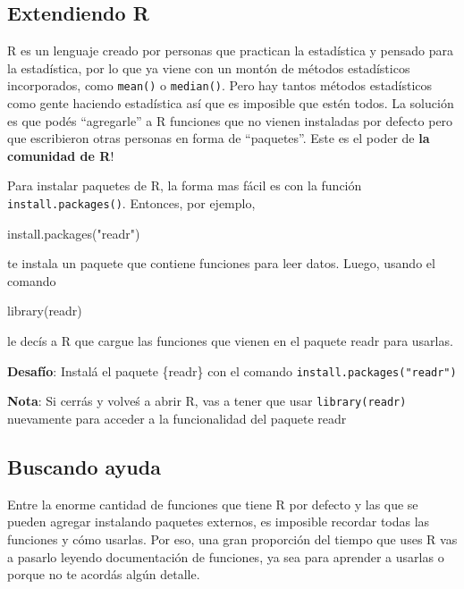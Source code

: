 \documentclass[
  openany]{book}
\newenvironment{Shaded}{\begin{snugshade}}{\end{snugshade}}
\newcommand{\FunctionTok}[1]{\textcolor[rgb]{0.00,0.00,0.00}{#1}}
\newcommand{\NormalTok}[1]{#1}
\newcommand{\StringTok}[1]{\textcolor[rgb]{0.31,0.60,0.02}{#1}}
\begin{document}
\hypertarget{extendiendo-r}{%
\subsection{Extendiendo R}\label{extendiendo-r}}

R es un lenguaje creado por personas que practican la estadística y pensado para la estadística, por lo que ya viene con un montón de métodos estadísticos incorporados, como \texttt{mean()} o \texttt{median()}.
Pero hay tantos métodos estadísticos como gente haciendo estadística así que es imposible que estén todos.
La solución es que podés ``agregarle'' a R funciones que no vienen instaladas por defecto pero que escribieron otras personas en forma de ``paquetes''.
Este es el poder de \textbf{la comunidad de R}!

Para instalar paquetes de R, la forma mas fácil es con la función \texttt{install.packages()}.
Entonces, por ejemplo,

\begin{Shaded}
\begin{Highlighting}[]
\FunctionTok{install.packages}\NormalTok{(}\StringTok{"readr"}\NormalTok{)}
\end{Highlighting}
\end{Shaded}

te instala un paquete que contiene funciones para leer datos.
Luego, usando el comando

\begin{Shaded}
\begin{Highlighting}[]
\FunctionTok{library}\NormalTok{(readr)}
\end{Highlighting}
\end{Shaded}

le decís a R que cargue las funciones que vienen en el paquete readr para usarlas.

\textbf{Desafío}: Instalá el paquete \{readr\} con el comando \texttt{install.packages("readr")}

\textbf{Nota}: Si cerrás y volveś a abrir R, vas a tener que usar \texttt{library(readr)} nuevamente para acceder a la funcionalidad del paquete readr

\hypertarget{buscando-ayuda}{%
\subsection{Buscando ayuda}\label{buscando-ayuda}}

Entre la enorme cantidad de funciones que tiene R por defecto y las que se pueden agregar instalando paquetes externos, es imposible recordar todas las funciones y cómo usarlas.
Por eso, una gran proporción del tiempo que uses R vas a pasarlo leyendo documentación de funciones, ya sea para aprender a usarlas o porque no te acordás algún detalle.
\end{document}

